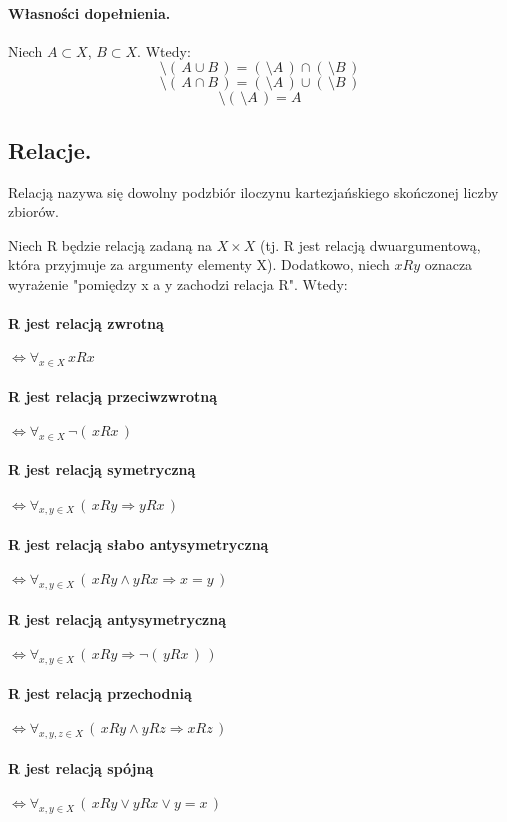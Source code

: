         \paragraph{Własności dopełnienia.}
        Niech $A \subset X$, $B \subset X$. Wtedy:
        \begin{equation*}
            \setminus(\,A \cup B\,) = (\,\setminus A\,) \cap (\,\setminus B\,)
        \end{equation*}
        \begin{equation*}
            \setminus(\,A \cap B\,) = (\,\setminus A\,) \cup (\,\setminus B\,)
        \end{equation*}
        \begin{equation*}
            \setminus(\,\setminus A\,) = A
        \end{equation*}

    \subsection{Relacje.}
    \begin{definition}
        Relacją nazywa się dowolny podzbiór iloczynu kartezjańskiego skończonej liczby zbiorów.
    \end{definition}

Niech R będzie relacją zadaną na $X \times X$ (tj. R jest relacją dwuargumentową, która przyjmuje za argumenty elementy X). Dodatkowo, niech $xRy$ oznacza wyrażenie "pomiędzy x a y zachodzi relacja R". Wtedy:
\paragraph{R jest relacją zwrotną} $\Leftrightarrow \forall_{x \in X} \, xRx$
\paragraph{R jest relacją przeciwzwrotną} $\Leftrightarrow \forall_{x \in X} \, \neg (\,xRx\,)$
\paragraph{R jest relacją symetryczną} $\Leftrightarrow \forall_{x,y \in X} \, (\,xRy \Longrightarrow yRx\,)$
\paragraph{R jest relacją słabo antysymetryczną} $\Leftrightarrow \forall_{x,y \in X} \, (\,xRy \wedge yRx \Longrightarrow x = y\,)$
\paragraph{R jest relacją antysymetryczną} $\Leftrightarrow \forall_{x,y \in X} \, (\,xRy \Longrightarrow \neg(\,yRx\,)\,)$
\paragraph{R jest relacją przechodnią} $\Leftrightarrow \forall_{x,y,z \in X} \, (\,xRy \wedge yRz \Longrightarrow xRz\,)$
\paragraph{R jest relacją spójną} $\Leftrightarrow \forall_{x,y \in X} \, (\,xRy \vee yRx \vee y = x\,)$
